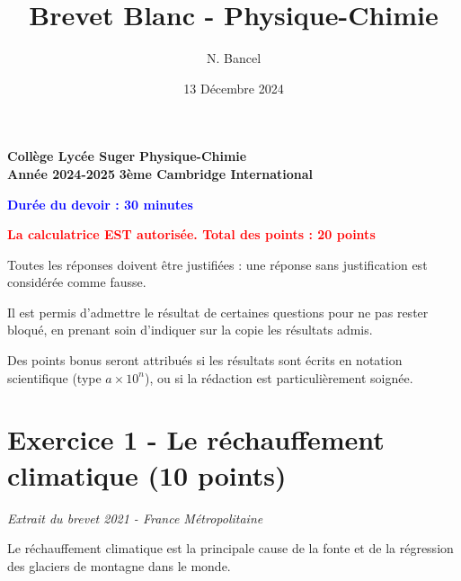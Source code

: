 \documentclass[answers]{exam}
\title{Brevet Blanc - Physique-Chimie}
\author{N. Bancel}
\date{13 Décembre 2024}
\begin{document}
\textbf{Collège Lycée Suger}
\hfill
\textbf{Physique-Chimie} \\

\textbf{Année 2024-2025}
\hfill
\textbf{3ème Cambridge International} \par

{\let\newpage\relax\maketitle}


  \begin{center}
    \textbf{\textcolor{blue}{Durée du devoir : 30 minutes}} \par
    \vspace{1em}
    \textbf{\textcolor{red}{La calculatrice EST autorisée. Total des points : 20 points}} \par
    \vspace{1em}
  \end{center}
  
  \begin{tcolorbox}[colback=gray!10!white, colframe=gray, title=Note importante]
    Toutes les réponses doivent être justifiées : une réponse sans justification est considérée comme fausse. \par
    \vspace{1em}
    Il est permis d'admettre le résultat de certaines questions pour ne pas rester bloqué, en prenant soin d'indiquer sur la copie les résultats admis. \par
    \vspace{1em}
    Des points bonus seront attribués si les résultats sont écrits en notation scientifique (type $a \times 10^n$), ou si la rédaction est particulièrement soignée. \par
    \vspace{1em}
  \end{tcolorbox}

\section*{Exercice 1 - Le réchauffement climatique (10 points)}

\textit{Extrait du brevet 2021 - France Métropolitaine} \par
\vspace{1em}
Le réchauffement climatique est la principale cause de la fonte et de la régression des glaciers de montagne dans le monde. \par 
\vspace{1em}
\end{document}
